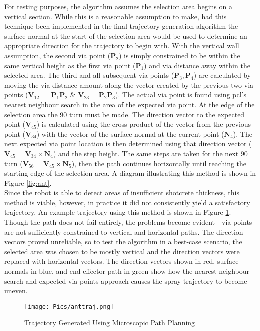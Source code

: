 For testing purposes, the algorithm assumes the selection area begins on a vertical section. While this is a reasonable assumption to make, had this technique been implemented in the final trajectory generation algorithm the surface normal at the start of the selection area would be used to determine an appropriate direction for the trajectory to begin with. With the vertical wall assumption, the second via point ($\mathbf{P}_2$) is simply constrained to be within the same vertical height as the first via point ($\mathbf{P}_1$) and via distance away within the selected area. The third and all subsequent via points ($\mathbf{P}_3,\mathbf{P}_4$) are calculated by moving the via distance amount along the vector created by the previous two via points ($\mathbf{V}_{12}\hspace{4pt} = \mathbf{P}_1\mathbf{P}_2\hspace{4pt} \& \hspace{4pt}\mathbf{V}_{23} = \mathbf{P}_2\mathbf{P}_3$). The actual via point is found using \acrshort{pcl}'s  nearest neighbour search in the area of the expected via point. At the edge of the selection area the 90\degree\hspace{0pt} turn must be made. The direction vector to the expected point ($\mathbf{V}_{45}$) is calculated using the cross product of the vector from the previous point ($\mathbf{V}_{34}$) with the vector of the surface normal at the current point ($\mathbf{N}_4$). The next expected via point location is then determined using that direction vector ($\mathbf{V}_{45} = \mathbf{V}_{34} \times \mathbf{N}_4$) and the step height. The same steps are taken for the next 90\degree\hspace{0pt} turn ($\mathbf{V}_{56} = \mathbf{V}_{45} \times \mathbf{N}_5$), then the path continues horizontally until reaching the starting edge of the selection area. A diagram illustrating this method is shown in Figure \ref{fig:ant}.\\


Since the robot is able to detect areas of insufficient shotcrete thickness, this method is viable, however, in practice it did not consistently yield a satisfactory trajectory. An example trajectory using this method is shown in Figure \ref{fig:anttraj}. Though the path does not fail entirely, the problems become evident - via points are not sufficiently constrained to vertical and horizontal paths. The direction vectors proved unreliable, so to test the algorithm in a best-case scenario, the selected area was chosen to be mostly vertical and the direction vectors were replaced with horizontal vectors. The direction vectors shown in red, surface normals in blue, and end-effector path in green show how the nearest neighbour search and expected via points approach causes the spray trajectory to become uneven.\\
\clearpage
\begin{figure}[h]
    \centering
    \texttt{[image: Pics/anttraj.png]}
    \caption{Trajectory Generated Using Microscopic Path Planning}
    \label{fig:anttraj}
\end{figure}

